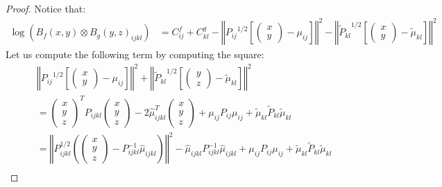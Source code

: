 \begin{proof}
Notice that:
    \begin{align}
        \log\left(B_f(x, y) \otimes B_g(y, z)_{ijkl}\right)& = C^f_{ij} + C^g_{kl} - \left\Vert {P_{ij}}^{1/2}\left[\begin{pmatrix}x\\ y\end{pmatrix}- \mu_{ij}\right]\right\Vert^2 - \left\Vert {\tilde P_{kl}}^{1/2}\left[\begin{pmatrix}x \\ y \end{pmatrix}- \tilde\mu_{kl}\right]\right\Vert^2
    \end{align}
Let us compute the following term by computing the square:
    \begin{align}
     &\left\Vert {P_{ij}}^{1/2}\left[\begin{pmatrix}x\\y\end{pmatrix}- \mu_{ij}\right]\right\Vert^2 + \left\Vert {\tilde P_{kl}}^{1/2}\left[\begin{pmatrix}y\\ z\end{pmatrix}- \tilde\mu_{kl}\right]\right\Vert^2 \\
     &= \begin{pmatrix}x\\ y\\ z\end{pmatrix}^TP_{ijkl}\begin{pmatrix}x\\ y\\ z\end{pmatrix}- 2\hat\mu_{ijkl}^T\begin{pmatrix}x\\ y\\ z\end{pmatrix} +\mu_{ij}P_{ij}\mu_{ij} + \tilde\mu_{kl}\tilde P_{kl}\tilde\mu_{kl}\\
     &= \left\Vert P_{ijkl}^{1/2}\left(\begin{pmatrix}x\\ y\\ z\end{pmatrix} - P_{ijkl}^{-1}\hat\mu_{ijkl}\right) \right\Vert^2 - \hat\mu_{ijkl}P_{ijkl}^{-1}\hat\mu_{ijkl}+\mu_{ij}P_{ij}\mu_{ij} + \tilde\mu_{kl}\tilde P_{kl}\tilde\mu_{kl}\\
    \end{align}


\end{proof}
